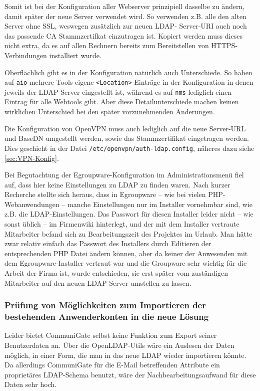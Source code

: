 \documentclass[11pt,a4paper,titlepage=firstiscover,headsepline,bibtotoc]{scrartcl} %
\begin{document}
Somit ist bei der Konfiguration aller Webserver prinzipiell dasselbe zu ändern, damit später der neue Server verwendet wird. So verwenden z.B. alle den alten Server ohne SSL, weswegen zusätzlich zur neuen LDAP- Server-URI auch noch das passende CA Stammzertifkat einzutragen ist. Kopiert werden muss dieses nicht extra, da es auf allen Rechnern bereits zum Bereitstellen von HTTPS-Verbindungen installiert wurde. 

Oberflächlich gibt es in der Konfiguration natürlich auch Unterschiede. So haben auf \texttt{aio} mehrere Tools eigene \texttt{<Location>}-Einträge in der Konfiguration in denen jeweils der LDAP Server eingestellt ist, während es auf \texttt{nms} lediglich einen Eintrag für alle Webtools gibt. Aber diese Detailunterschiede machen keinen wirklichen Unterschied bei den später vorzunehmenden Änderungen.

Die Konfiguration von OpenVPN muss auch lediglich auf die neue Server-URL und BaseDN umgestellt werden, sowie das Stammzertifikat eingetragen werden. Dies geschieht in der Datei \texttt{/etc/openvpn/auth-ldap.config}, näheres dazu siehe \autoref{sec:VPN-Konfig}.

Bei Begutachtung der Egroupware-Konfiguration im Administrationsmenü fiel auf, dass hier keine Einstellungen zu LDAP zu finden waren. Nach kurzer Recherche stellte sich heraus, dass in Egroupware -- wie bei vielen PHP-Webanwendungen -- manche Einstellungen nur im Installer vornehmbar sind, wie z.B. die LDAP-Einstellungen. Das Passwort für diesen Installer leider nicht -- wie sonst üblich -- im Firmenwiki hinterlegt, und der mit dem Installer vertraute Mitarbeiter befand sich zu Bearbeitungszeit des Projektes im Urlaub. Man hätte zwar relativ einfach das Passwort des Installers durch Editieren der entsprechenden PHP Datei ändern können, aber da keiner der Anwesenden mit dem Egroupware-Installer vertraut war und die Groupware sehr wichtig für die Arbeit der Firma ist, wurde entschieden, sie erst später vom zuständigen Mitarbeiter auf den neuen LDAP-Server umstellen zu lassen. 

\subsubsection{Prüfung von Möglichkeiten zum Importieren der bestehenden Anwenderkonten in die neue Lösung} \label{sec:Importsuche}
Leider bietet CommuniGate selbst keine Funktion zum Export seiner Benutzerdaten an. Über die OpenLDAP-Utils wäre ein Auslesen der Daten möglich, in einer Form, die man in das neue LDAP wieder importieren könnte. Da allerdings CommuniGate für die E-Mail betreffenden Attribute ein proprietäres LDAP-Schema benutzt, wäre der Nachbearbeitungsaufwand für diese Daten sehr hoch. 
\end{document}
